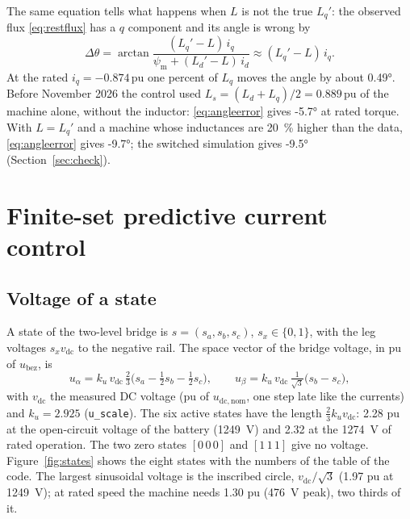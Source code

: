 \documentclass[11pt,a4paper]{scrartcl}
\newcommand{\ped}[1]{_{\mathrm{#1}}}
\newcommand{\code}[1]{\texttt{#1}}
\newcommand{\pun}{\,\mathrm{pu}}
\begin{document}
\begin{onehalfspace}
The same equation tells what happens when $L$ is not the true $L_q'$: the observed flux \eqref{eq:restflux} has a $q$ component and its angle is wrong by
\begin{equation}
	\Delta\theta = \arctan\frac{(L_q'-L)\,i_q}{\psi\ped{m} + (L_d'-L)\,i_d} \approx (L_q' - L)\,i_q .
	\label{eq:angleerror}
\end{equation}
At the rated $i_q = -0.874\pun$ one percent of $L_q$ moves the angle by about \ang{0.49}. Before November 2026 the control used $L_s = (L_d + L_q)/2 = 0.889\pun$ of the machine alone, without the inductor: \eqref{eq:angleerror} gives \ang{-5.7} at rated torque. With $L = L_q'$ and a machine whose inductances are \SI{20}{\percent} higher than the data, \eqref{eq:angleerror} gives \ang{-9.7}; the switched simulation gives \ang{-9.5} (Section~\ref{sec:check}).

\section{Finite-set predictive current control}
\label{sec:mpc}

\subsection{Voltage of a state}
\label{sec:states}

A state of the two-level bridge is $s = (s_a, s_b, s_c)$, $s_x \in \{0, 1\}$, with the leg voltages $s_x v\ped{dc}$ to the negative rail. The space vector of the bridge voltage, in pu of $u\ped{bez}$, is
\begin{equation}
	u_\alpha = k_u\,v\ped{dc}\,\tfrac23\big(s_a - \tfrac12 s_b - \tfrac12 s_c\big), \qquad
	u_\beta = k_u\,v\ped{dc}\,\tfrac{1}{\sqrt3}\big(s_b - s_c\big),
	\label{eq:ustate}
\end{equation}
with $v\ped{dc}$ the measured DC voltage (pu of $u\ped{dc,nom}$, one step late like the currents) and $k_u = 2.925$ (\code{u\_scale}). The six active states have the length $\frac23 k_u v\ped{dc}$: \SI{2.28}{} pu at the open-circuit voltage of the battery (\SI{1249}{\volt}) and 2.32 at the \SI{1274}{\volt} of rated operation. The two zero states $[0\,0\,0]$ and $[1\,1\,1]$ give no voltage. Figure~\ref{fig:states} shows the eight states with the numbers of the table of the code. The largest sinusoidal voltage is the inscribed circle, $v\ped{dc}/\sqrt3$ (\SI{1.97}{} pu at \SI{1249}{\volt}); at rated speed the machine needs \SI{1.30}{} pu (\SI{476}{\volt} peak), two thirds of it.


\end{onehalfspace}
\end{document}
